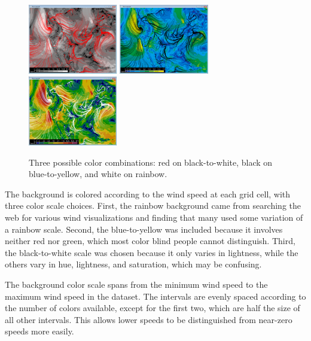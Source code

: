 \documentclass{article} %
\begin{document}
\begin{figure}[htb]
   \centering
   \includegraphics[height=1.2in]{images/basic_bw_red.eps}
   \includegraphics[height=1.2in]{images/basic_by_black.eps}
   \includegraphics[height=1.2in]{images/basic_rainbow_white.eps}
    \caption{Three possible color combinations: red on black-to-white, black on blue-to-yellow, and white on rainbow.}
   \label{fig:colors}
\end{figure}

The background is colored according to the wind speed at each grid cell, with three color scale choices.  First, the rainbow background came from searching the web for various wind visualizations and finding that many used some variation of a rainbow scale.  Second, the blue-to-yellow was included because it involves neither red nor green, which most color blind people cannot distinguish.  Third, the black-to-white scale was chosen because it only varies in lightness, while the others vary in hue, lightness, and saturation, which may be confusing.

The background color scale spans from the minimum wind speed to the maximum wind speed in the dataset.  The intervals are evenly spaced according to the number of colors available, except for the first two, which are half the size of all other intervals. This allows lower speeds to be distinguished from near-zero speeds more easily.
\end{document}
